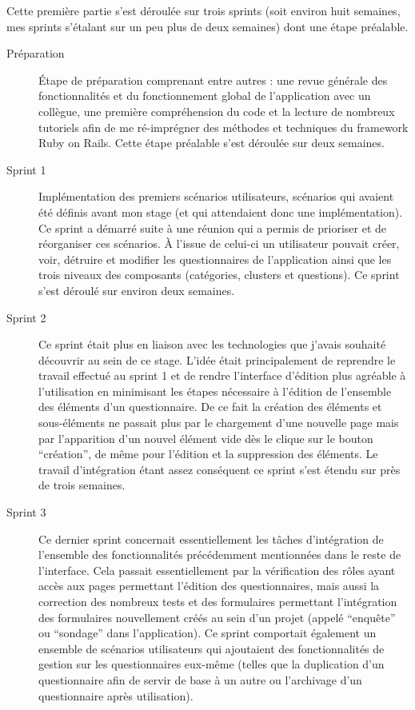 \documentclass[12pt,a4paper]{book}
\begin{document}
Cette première partie s'est déroulée sur trois sprints (soit environ huit semaines, mes sprints s'étalant sur un peu plus de deux semaines) dont une étape préalable. 

\begin{description}
  \item[Préparation] Étape de préparation comprenant entre autres : une revue générale des fonctionnalités et du fonctionnement global de l'application avec un collègue, une première compréhension du code et la lecture de nombreux tutoriels afin de me ré-imprégner des méthodes et techniques du framework Ruby on Rails. Cette étape préalable s'est déroulée sur deux semaines.
  \item[Sprint 1] Implémentation des premiers scénarios utilisateurs, scénarios qui avaient été définis avant mon stage (et qui attendaient donc une implémentation). Ce sprint a démarré suite à une réunion qui a permis de prioriser et de réorganiser ces scénarios. À l'issue de celui-ci un utilisateur pouvait créer, voir, détruire et modifier les questionnaires de l'application ainsi que les trois niveaux des composants (catégories, clusters et questions). Ce sprint s'est déroulé sur environ deux semaines.
  \item[Sprint 2] Ce sprint était plus en liaison avec les technologies que j'avais souhaité découvrir au sein de ce stage. L'idée était principalement de reprendre le travail effectué au sprint 1 et de rendre l'interface d'édition plus agréable à l'utilisation en minimisant les étapes nécessaire à l'édition de l'ensemble des éléments d'un questionnaire. De ce fait la création des éléments et sous-éléments ne passait plus par le chargement d'une nouvelle page mais par l'apparition d'un nouvel élément vide dès le clique sur le bouton ``création'', de même pour l'édition et la suppression des éléments. Le travail d'intégration étant assez conséquent ce sprint s'est étendu sur près de trois semaines.
  \item[Sprint 3] Ce dernier sprint concernait essentiellement les tâches d'intégration de l'ensemble des fonctionnalités précédemment mentionnées dans le reste de l'interface. Cela passait essentiellement par la vérification des rôles ayant accès aux pages permettant l'édition des questionnaires, mais aussi la correction des nombreux tests et des formulaires permettant l'intégration des formulaires nouvellement créés au sein d'un projet (appelé ``enquête'' ou ``sondage'' dans l'application). Ce sprint comportait également un ensemble de scénarios utilisateurs qui ajoutaient des fonctionnalités de gestion sur les questionnaires eux-même (telles que la duplication d'un questionnaire afin de servir de base à un autre ou l'archivage d'un questionnaire après utilisation).
\end{description}
\end{document}
